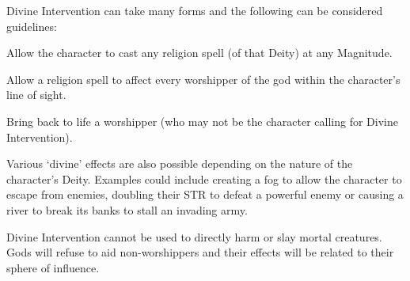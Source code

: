 Divine Intervention can take many forms and the following can be considered guidelines: 
\begin{rpg-list}
	\item Allow the character to cast any religion spell (of that Deity) at any Magnitude.
	\item Allow a religion spell to affect every worshipper of the god within the character’s line of sight. 
	\item Bring back to life a worshipper (who may not be the character calling for Divine Intervention). 
\end{rpg-list}

Various ‘divine’ effects are also possible depending on the nature of the character’s Deity. Examples could include creating a fog to allow the character to escape from enemies, doubling their STR to defeat a powerful enemy or causing a river to break its banks to stall an invading army. 

Divine Intervention cannot be used to directly harm or slay mortal creatures. Gods will refuse to aid non-worshippers and their effects will be related to their sphere of influence. 







